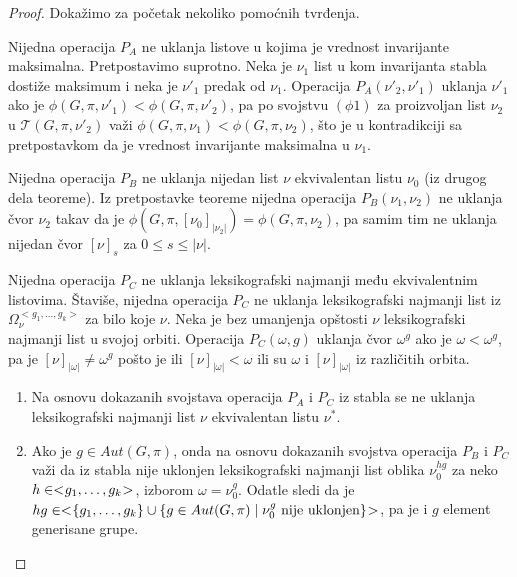 \documentclass[12pt,oneside]{memoir}
\theoremstyle{definition}
\begin{document}
  \begin{proof}
	  Dokažimo za početak nekoliko pomoćnih tvrđenja.

	  Nijedna operacija $P_A$ ne uklanja listove u kojima je vrednost
	  invarijante maksimalna. Pretpostavimo suprotno. Neka je $\nu_1$ list u
	  kom invarijanta stabla dostiže maksimum i neka je $\nu'_1$ predak od
	  $\nu_1$. Operacija $P_A(\nu'_2, \nu'_1)$ uklanja $\nu'_1$ ako je $\phi(G,
	  \pi, \nu'_1) < \phi(G, \pi, \nu'_2)$, pa po svojstvu $(\phi1)$ za
	  proizvoljan list $\nu_2$ u $\mathcal{T}(G, \pi, \nu'_2)$ važi $\phi(G,
	  \pi, \nu_1) < \phi(G, \pi, \nu_2)$, što je u kontradikciji sa
	  pretpostavkom da je vrednost invarijante maksimalna u $\nu_1$.

	  Nijedna operacija $P_B$ ne uklanja nijedan list $\nu$ ekvivalentan listu
	  $\nu_0$ (iz drugog dela teoreme). Iz pretpostavke teoreme nijedna
	  operacija $P_B(\nu_1, \nu_2)$ ne uklanja čvor $\nu_2$ takav da je
	  $\phi(G, \pi, [\nu_0]_{|\nu_2|}) = \phi(G, \pi, \nu_2)$, pa samim tim ne
	  uklanja nijedan čvor $[\nu]_{s}$ za $0 \leq s \leq |\nu|$.

	  Nijedna operacija $P_C$ ne uklanja leksikografski najmanji među
	  ekvivalentnim listovima. Štaviše, nijedna operacija $P_C$ ne uklanja
	  leksikografski najmanji list iz $\Omega_\nu^{<g_1, \dots, g_k>}$ za bilo
	  koje $\nu$. Neka je bez umanjenja opštosti $\nu$ leksikografski najmanji
	  list u svojoj orbiti. Operacija $P_C(\omega, g)$ uklanja čvor $\omega^g$
	  ako je $\omega < \omega^g$, pa je $[\nu]_{|\omega|} \neq \omega^g$ pošto
	  je ili $[\nu]_{|\omega|} < \omega$ ili su $\omega$ i $[\nu]_{|\omega|}$ iz
	  različitih orbita.
	  \begin{enumerate}
		  \item Na osnovu dokazanih svojstava operacija $P_A$ i $P_C$ iz stabla
			  se ne uklanja leksikografski najmanji list $\nu$ ekvivalentan
			  listu $\nu^*$.
		  \item Ako je $g \in Aut(G, \pi)$, onda na osnovu dokazanih svojstva
			  operacija $P_B$ i $P_C$ važi da iz stabla nije uklonjen
			  leksikografski najmanji list oblika $\nu_0^{hg}$ za neko $h \in <
			  \negmedspace g_1, \dots, g_k \negmedspace >$, izborom $\omega =
			  \nu_0^g$. Odatle sledi da je $hg \in < \negmedspace \{g_1, \dots,
			  g_k\} \cup \{g \in Aut(G, \pi) \mid \nu_0^g \text{ nije
			  uklonjen}\} \negmedspace >$, pa je i $g$ element generisane
			  grupe.
	  \end{enumerate}
  \end{proof}
\end{document}
